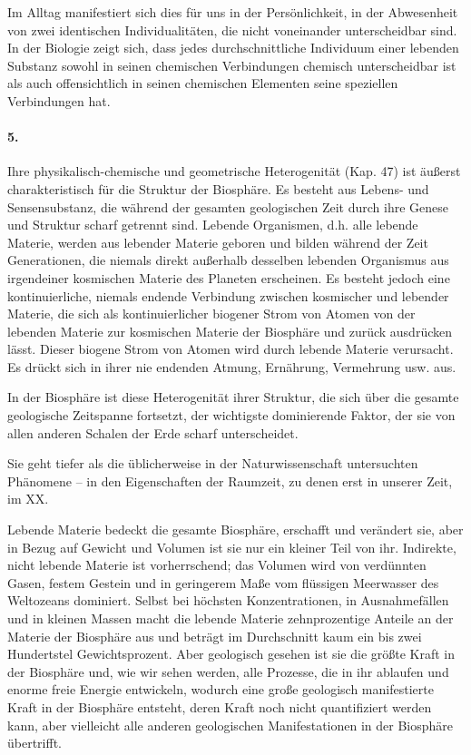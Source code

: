 \documentclass[11pt,a4paper]{book}
\begin{document}
Im Alltag manifestiert sich dies für uns in der Persönlichkeit, in der
Abwesenheit von zwei identischen Individualitäten, die nicht voneinander
unterscheidbar sind. In der Biologie zeigt sich, dass jedes durchschnittliche
Individuum einer lebenden Substanz sowohl in seinen chemischen Verbindungen
chemisch unterscheidbar ist als auch offensichtlich in seinen chemischen
Elementen seine speziellen Verbindungen hat.

\paragraph{5.}
Ihre physikalisch-chemische und geometrische Heterogenität (Kap. 47) ist
äußerst charakteristisch für die Struktur der Biosphäre. Es besteht aus
Lebens- und Sensensubstanz, die während der gesamten geologischen Zeit durch
ihre Genese und Struktur scharf getrennt sind. Lebende Organismen, d.h. alle
lebende Materie, werden aus lebender Materie geboren und bilden während der
Zeit Generationen, die niemals direkt außerhalb desselben lebenden Organismus
aus irgendeiner kosmischen Materie des Planeten erscheinen. Es besteht jedoch
eine kontinuierliche, niemals endende Verbindung zwischen kosmischer und
lebender Materie, die sich als kontinuierlicher biogener Strom von Atomen von
der lebenden Materie zur kosmischen Materie der Biosphäre und zurück
ausdrücken lässt. Dieser biogene Strom von Atomen wird durch lebende Materie
verursacht. Es drückt sich in ihrer nie endenden Atmung, Ernährung, Vermehrung
usw. aus.

In der Biosphäre ist diese Heterogenität ihrer Struktur, die sich über die
gesamte geologische Zeitspanne fortsetzt, der wichtigste dominierende Faktor,
der sie von allen anderen Schalen der Erde scharf unterscheidet.

Sie geht tiefer als die üblicherweise in der Naturwissenschaft untersuchten
Phänomene -- in den Eigenschaften der Raumzeit, zu denen erst in unserer Zeit,
im XX.

Lebende Materie bedeckt die gesamte Biosphäre, erschafft und verändert sie,
aber in Bezug auf Gewicht und Volumen ist sie nur ein kleiner Teil von
ihr. Indirekte, nicht lebende Materie ist vorherrschend; das Volumen wird von
verdünnten Gasen, festem Gestein und in geringerem Maße vom flüssigen
Meerwasser des Weltozeans dominiert. Selbst bei höchsten Konzentrationen, in
Ausnahmefällen und in kleinen Massen macht die lebende Materie zehnprozentige
Anteile an der Materie der Biosphäre aus und beträgt im Durchschnitt kaum ein
bis zwei Hundertstel Gewichtsprozent. Aber geologisch gesehen ist sie die
größte Kraft in der Biosphäre und, wie wir sehen werden, alle Prozesse, die in
ihr ablaufen und enorme freie Energie entwickeln, wodurch eine große
geologisch manifestierte Kraft in der Biosphäre entsteht, deren Kraft noch
nicht quantifiziert werden kann, aber vielleicht alle anderen geologischen
Manifestationen in der Biosphäre übertrifft.
\end{document}
